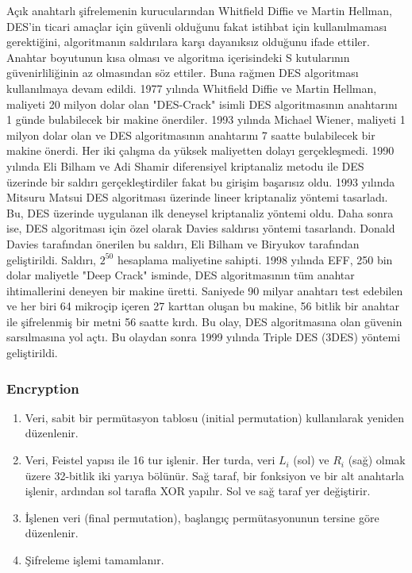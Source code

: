 Açık anahtarlı şifrelemenin kurucularından Whitfield Diffie ve Martin Hellman, DES'in ticari amaçlar için güvenli olduğunu fakat istihbat için kullanılmaması gerektiğini, algoritmanın saldırılara karşı dayanıksız olduğunu ifade ettiler. Anahtar boyutunun kısa olması ve algoritma içerisindeki S kutularının güvenirliliğinin az olmasından söz ettiler. Buna rağmen DES algoritması kullanılmaya devam edildi. 1977 yılında Whitfield Diffie ve Martin Hellman, maliyeti 20 milyon dolar olan "DES-Crack" isimli DES algoritmasının anahtarını 1 günde bulabilecek bir makine önerdiler. 1993 yılında Michael Wiener, maliyeti 1 milyon dolar olan ve DES algoritmasının anahtarını 7 saatte bulabilecek bir makine önerdi. Her iki çalışma da yüksek maliyetten dolayı gerçekleşmedi. 1990 yılında Eli Bilham ve Adi Shamir diferensiyel kriptanaliz metodu ile DES üzerinde bir saldırı gerçekleştirdiler fakat bu girişim başarısız oldu. 1993 yılında Mitsuru Matsui DES algoritması üzerinde lineer kriptanaliz yöntemi tasarladı. Bu, DES üzerinde uygulanan ilk deneysel kriptanaliz yöntemi oldu. Daha sonra ise, DES algoritması için özel olarak Davies saldırısı yöntemi tasarlandı. Donald Davies tarafından önerilen bu saldırı, Eli Bilham ve Biryukov tarafından geliştirildi. Saldırı, $2^{50}$ hesaplama maliyetine sahipti. 1998 yılında EFF, 250 bin dolar maliyetle "Deep Crack" isminde, DES algoritmasının tüm anahtar ihtimallerini deneyen bir makine üretti. Saniyede 90 milyar anahtarı test edebilen ve her biri 64 mikroçip içeren 27 karttan oluşan bu makine, 56 bitlik bir anahtar ile şifrelenmiş bir metni 56 saatte kırdı. Bu olay, DES algoritmasına olan güvenin sarsılmasına yol açtı. Bu olaydan sonra 1999 yılında Triple DES (3DES) yöntemi geliştirildi.

\subsubsection{Encryption}

\begin{enumerate}
    \item Veri, sabit bir permütasyon tablosu (initial permutation) kullanılarak yeniden düzenlenir.
    \item Veri, Feistel yapısı ile 16 tur işlenir. Her turda, veri $L_i$ (sol) ve $R_i$ (sağ) olmak üzere 32-bitlik iki yarıya bölünür. Sağ taraf, bir fonksiyon ve bir alt anahtarla işlenir, ardından sol tarafla XOR yapılır. Sol ve sağ taraf yer değiştirir.
    \item İşlenen veri (final permutation), başlangıç permütasyonunun tersine göre düzenlenir.
    \item Şifreleme işlemi tamamlanır.
\end{enumerate}

